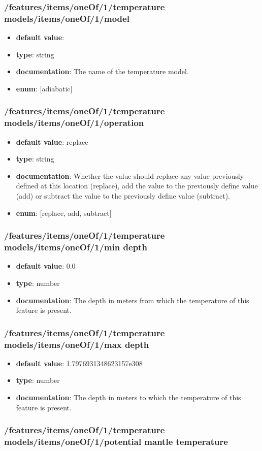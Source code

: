 \subsubsection{/features/items/oneOf/1/temperature models/items/oneOf/1/model}
\begin{itemize}\item {\bf default value}: 
\item {\bf type}: string
\item {\bf documentation}: The name of the temperature model.
\item {\bf enum}: [adiabatic]\end{itemize}\subsubsection{/features/items/oneOf/1/temperature models/items/oneOf/1/operation}
\begin{itemize}\item {\bf default value}: replace
\item {\bf type}: string
\item {\bf documentation}: Whether the value should replace any value previously defined at this location (replace), add the value to the previously define value (add) or subtract the value to the previously define value (subtract).
\item {\bf enum}: [replace, add, subtract]\end{itemize}\subsubsection{/features/items/oneOf/1/temperature models/items/oneOf/1/min depth}
\begin{itemize}\item {\bf default value}: 0.0
\item {\bf type}: number
\item {\bf documentation}: The depth in meters from which the temperature of this feature is present.
\end{itemize}\subsubsection{/features/items/oneOf/1/temperature models/items/oneOf/1/max depth}
\begin{itemize}\item {\bf default value}: 1.7976931348623157e308
\item {\bf type}: number
\item {\bf documentation}: The depth in meters to which the temperature of this feature is present.
\end{itemize}\subsubsection{/features/items/oneOf/1/temperature models/items/oneOf/1/potential mantle temperature}
